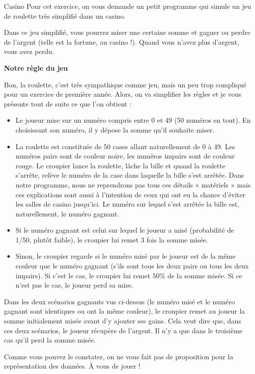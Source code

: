 \newpage
\begin{Exercice}{Casino}
	Pour cet exercice,
	on vous demande un petit programme qui simule un jeu de roulette
	très simplifié dans un casino.
	
	Dans ce jeu simplifié, vous pourrez miser une certaine somme 
	et gagner ou perdre de l'argent (telle est la fortune, au casino !). 
	Quand vous n'avez plus d'argent, vous avez perdu.

	\textbf{Notre règle du jeu}

	Bon, la roulette, c'est très sympathique comme jeu, 
	mais un peu trop compliqué pour un exercice de première année.
	Alors, on va simplifier les règles et je vous présente tout de suite 
	ce que l'on obtient :
	\begin{itemize}
	\item
		Le joueur mise sur un numéro compris entre 0 et 49 (50 numéros en tout). 
		En choisissant son numéro, il y dépose la somme qu'il souhaite miser.
	\item
		La roulette est constituée de 50 cases allant naturellement de 0 à 49. 
		Les numéros pairs sont de couleur noire, 
		les numéros impairs sont de couleur rouge. 
		Le croupier lance la roulette, 
		lâche la bille et quand la roulette s'arrête, 
		relève le numéro de la case dans laquelle la bille s'est arrêtée. 
		Dans notre programme, nous ne reprendrons pas tous ces détails 
		« matériels » mais ces explications sont aussi à l'intention 
		de ceux qui ont eu la chance d'éviter les salles de casino jusqu'ici. 
		Le numéro sur lequel s'est arrêtée la bille est, naturellement, 
		le numéro gagnant.
	\item
		Si le numéro gagnant est celui sur lequel le joueur a misé 
		(probabilité de 1/50, plutôt faible), 
		le croupier lui remet 3 fois la somme misée.
	\item
		Sinon, le croupier regarde si le numéro misé par le joueur 
		est de la même couleur que le numéro gagnant 
		(s'ils sont tous les deux pairs ou tous les deux impairs). 
		Si c'est le cas, le croupier lui remet 50\% de la somme misée. 
		Si ce n'est pas le cas, le joueur perd sa mise.
	\end{itemize}
	
	Dans les deux scénarios gagnants vus ci-dessus 
	(le numéro misé et le numéro gagnant sont identiques ou ont la même couleur), 
	le croupier remet au joueur la somme initialement misée avant d'y ajouter ses gains. 
	Cela veut dire que, dans ces deux scénarios, le joueur récupère de l'argent. 
	Il n'y a que dans le troisième cas qu'il perd la somme misée.
	
	Comme vous pouvez le constater,
	on ne vous fait pas de proposition pour la représentation des données.
	À vous de jouer !
\end{Exercice}

